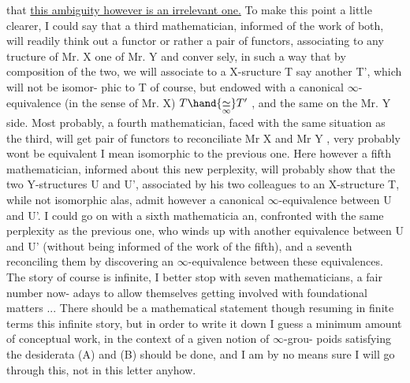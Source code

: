 that \uline{this ambiguity however is an irrelevant one.} To make this point
a little clearer, I could say that a third mathematician, informed of
the work of both, will readily think out a functor or rather a pair of
functors, associating to any tructure of Mr. X one of Mr. Y and conver%
\hand{-}sely, in such a way that by composition of the two, we will associate
to a X-sructure \hand{(}T say\hand{)} another T', which  will not be isomor-%
phic to T of course, but endowed with a canonical  $\infty$-equivalence
(in the sense of Mr. X) $T \hand{\underset{\infty}{\simeq}} T'$ , and the same on the Mr. Y side. Most
probably, a fourth mathematician, faced with the same situation as the
third, will get   pair of functors to reconciliate Mr X and Mr
Y ,   very probably  wont be equivalent  \hand{(}I mean
isomorphic\hand{)} to the previous one. Here however a fifth mathematician,
informed about this new perplexity, will probably show that the two
Y-structures U and U', associated by his two colleagues to  an
X-structure T, while not isomorphic alas, admit however a canonical
$\infty$-equivalence between U and U'. I could go on with a sixth mathematicia%
an, confronted with the same perplexity as the previous one, who winds
up with another \inserted{$\infty$-}equivalence between U and U' (without being informed of
the work of the fifth), and a seventh reconciling them by discovering
an $\infty$-equivalence between these equivalences. The story of course is
infinite, I better stop with seven mathematicians, a fair number now-%
adays to allow themselves getting involved with foundational matters ...
There should be a mathematical statement though resuming in finite terms
this infinite story, but in order to write it down I guess a minimum
amount of conceptual work, in the context of a given notion of $\infty$-grou-%
poids satisfying the desiderata (A) and (B) should be done, and I am by
no means sure I will go through this, not in this letter anyhow.

